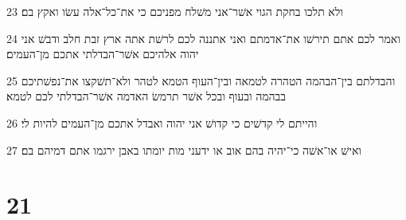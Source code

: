 \par 23 ולא תלכו בחקת הגוי אשׁר־אני משׁלח מפניכם כי את־כל־אלה עשׂו ואקץ בם׃
\par 24 ואמר לכם אתם תירשׁו את־אדמתם ואני אתננה לכם לרשׁת אתה ארץ זבת חלב ודבשׁ אני יהוה אלהיכם אשׁר־הבדלתי אתכם מן־העמים׃
\par 25 והבדלתם בין־הבהמה הטהרה לטמאה ובין־העוף הטמא לטהר ולא־תשׁקצו את־נפשׁתיכם בבהמה ובעוף ובכל אשׁר תרמשׂ האדמה אשׁר־הבדלתי לכם לטמא׃
\par 26 והייתם לי קדשׁים כי קדושׁ אני יהוה ואבדל אתכם מן־העמים להיות לי׃
\par 27 ואישׁ או־אשׁה כי־יהיה בהם אוב או ידעני מות יומתו באבן ירגמו אתם דמיהם בם׃

\chapter{21}

